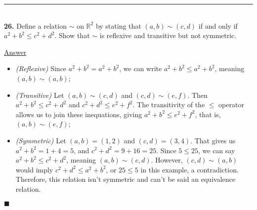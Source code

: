 \documentclass{article}[10pt]
\newenvironment{exercise}[1]
    {\noindent\rule{2cm}{0.4pt} \\
     \textbf{#1.}}
    {}
\newcommand{\answer}{

  \underline{Answer}

}
\newcommand{\qed}{

\hfill\ensuremath{\blacksquare}

}
\begin{document}
\begin{exercise}{26}
  Define a relation $\sim$ on $\mathds{R}^2$
  by stating that $(a, b) \sim (c, d)$
  if and only if $a^2 + b^2 \le c^2 + d^2$.
  Show that $\sim$ is reflexive and transitive but not symmetric.
  \answer
  \begin{itemize}
    \item \emph{(Reflexive)}
      Since $a^2 + b^2 = a^2 + b^2$,
      we can write $a^2 + b^2 \le a^2 + b^2$,
      meaning $(a, b) \sim (a, b)$;
    \item \emph{(Transitive)}
      Let $(a, b) \sim (c, d)$ and $(c, d) \sim (e, f)$.
      Then $a^2 + b^2 \le c^2 + d^2$
      and $c^2 + d^2 \le e^2 + f^2$.
      The transitivity of the $\le$ operator
      allows us to join these inequations,
      giving $a^2 + b^2 \le e^2 + f^2$,
      that is, $(a, b) \sim (e, f)$;
    \item \emph{(Symmetric)}
      Let $(a, b) = (1, 2)$ and $(c, d) = (3, 4)$.
      That gives us $a^2 + b^2 = 1 + 4 = 5$,
      and $c^2 + d^2 = 9 + 16 = 25$.
      Since $5 \le 25$, we can say $a^2 + b^2 \le c^2 + d^2$,
      meaning $(a, b) \sim (c, d)$.
      However, $(c, d) \sim (a, b)$ would imply
      $c^2 + d^2 \le a^2 + b^2$,
      or $25 \le 5$ in this example,
      a contradiction.
      Therefore, this relation isn't symmetric
      and can't be said an equivalence relation.
  \end{itemize}
  \qed
\end{exercise}
\end{document}
